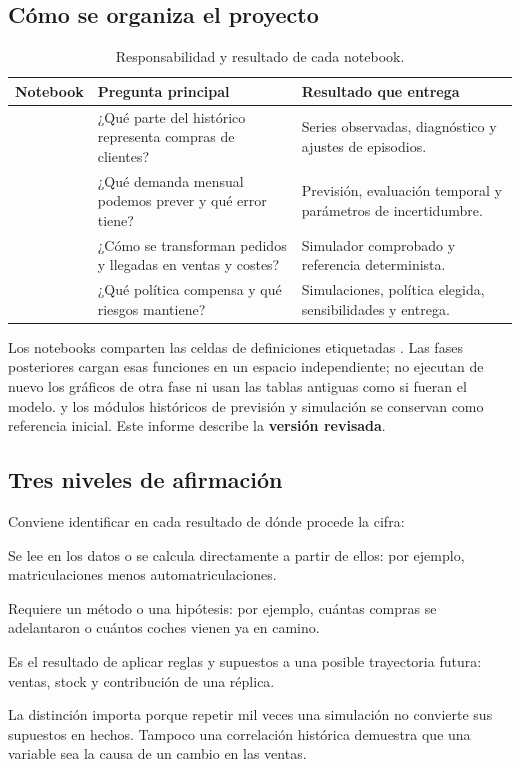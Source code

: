 \subsection{Cómo se organiza el proyecto}
\begin{table}[htbp]\centering
\caption{Responsabilidad y resultado de cada notebook.}\label{tab:mapa-notebooks}
\begin{tabularx}{\linewidth}{@{}p{3.4cm}YY@{}}\toprule
Notebook & Pregunta principal & Resultado que entrega \\\midrule
{} & ¿Qué parte del histórico representa compras de clientes?
& Series observadas, diagnóstico y ajustes de episodios.\\
 & ¿Qué demanda mensual podemos prever y qué error tiene?
& Previsión, evaluación temporal y parámetros de incertidumbre.\\
 & ¿Cómo se transforman pedidos y llegadas en ventas y costes?
& Simulador comprobado y referencia determinista.\\
 & ¿Qué política compensa y qué riesgos mantiene?
& Simulaciones, política elegida, sensibilidades y entrega.\\\bottomrule
\end{tabularx}
\end{table}

Los notebooks comparten las celdas de definiciones etiquetadas .
Las fases posteriores cargan esas funciones en un espacio independiente; no
ejecutan de nuevo los gráficos de otra fase ni usan las tablas antiguas como si
fueran el modelo.  y los módulos históricos de previsión
y simulación se conservan como referencia inicial. Este informe describe la
\textbf{versión revisada}.

\subsection{Tres niveles de afirmación}
Conviene identificar en cada resultado de dónde procede la cifra:
\begin{description}[style=nextline]
  \item[Observado.] Se lee en los datos o se calcula directamente a partir de
  ellos: por ejemplo, matriculaciones menos automatriculaciones.
  \item[Estimado o supuesto.] Requiere un método o una hipótesis: por ejemplo,
  cuántas compras se adelantaron o cuántos coches vienen ya en camino.
  \item[Simulado.] Es el resultado de aplicar reglas y supuestos a una posible
  trayectoria futura: ventas, stock y contribución de una réplica.
\end{description}
La distinción importa porque repetir mil veces una simulación no convierte sus
supuestos en hechos. Tampoco una correlación histórica demuestra que una variable
sea la causa de un cambio en las ventas.

